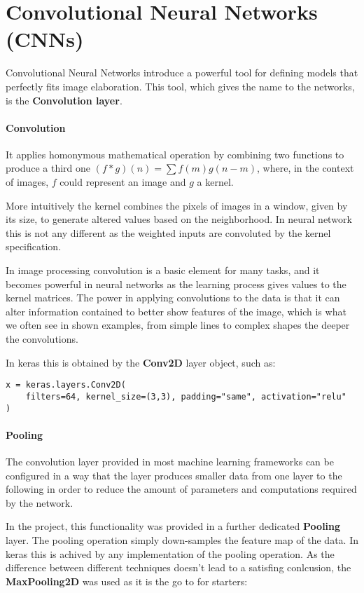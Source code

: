 \newpage


\section{Convolutional Neural Networks (CNNs)}
\label{sec:convolutional-neural-networks-(cnns)}

Convolutional Neural Networks introduce a powerful tool for defining models that perfectly fits image elaboration.
This tool, which gives the name to the networks, is the \textbf{Convolution layer}.

\paragraph{Convolution}
It applies homonymous mathematical operation by combining two functions to produce a third one $(f\ast g)(n) = \sum f(m)g(n-m)$,
where, in the context of images, $f$ could represent an image and $g$ a kernel.

More intuitively the kernel combines the pixels of images in a window, given by its size,
to generate altered values based on the neighborhood.
In neural network this is not any different as the weighted inputs are convoluted by the kernel specification.

In image processing convolution is a basic element for many tasks, and it becomes powerful in neural networks
as the learning process gives values to the kernel matrices.
The power in applying convolutions to the data is that it can alter information contained to better show features of
the image, which is what we often see in shown examples, from simple lines to complex shapes the deeper the convolutions.

In keras this is obtained by the \textbf{Conv2D}\cite{con2d} layer object, such as:
\begin{verbatim}
x = keras.layers.Conv2D(
    filters=64, kernel_size=(3,3), padding="same", activation="relu"
)
\end{verbatim}

\paragraph{Pooling}
The convolution layer provided in most machine learning frameworks can be configured in a way that the layer produces
smaller data from one layer to the following in order to reduce the amount of parameters and computations required by the network.

In the project, this functionality was provided in a further dedicated \textbf{Pooling} layer.
The pooling operation simply down-samples the feature map of the data. In keras this is achived by any implementation
of the pooling operation. As the difference between different techniques doesn't lead to a satisfing
conlcusion\cite{bieder2021comparison}, the \textbf{MaxPooling2D}\cite{maxpooling2d} was used as it is the go to for starters:

